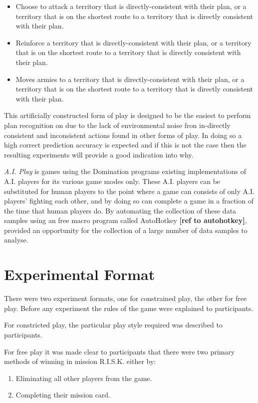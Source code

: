 \documentclass[parskip]{cs4rep}
\begin{document}
\begin{itemize}
\item
Choose to attack a territory that is directly-consistent with their plan, or a territory that is on the shortest route to a territory that is directly consistent with their plan.
\item
Reinforce a territory that is directly-consistent with their plan, or a territory that is on the shortest route to a territory that is directly consistent with their plan.
\item
Moves armies to a territory that is directly-consistent with their plan, or a territory that is on the shortest route to a territory that is directly consistent with their plan.
\end{itemize}

This artificially constructed form of play is designed to be the easiest to perform plan recognition on due to the lack of environmental noise fron in-directly consistent and inconsistent actions found in other forms of play. In doing so a high correct prediction accuracy is expected and if this is not the case then the resulting experiments will provide a good indication into why.

\textit{A.I. Play} is games using the Domination programs existing implementations of A.I. players for its various game modes only. These A.I. players can be substituted for human players to the point where a game can consists of only A.I. players' fighting each other, and by doing so can complete a game in a fraction of the time that human players do. By automating the collection of these data samples using an free macro program called AutoHotkey \textbf{[ref to autohotkey]}, provided an opportunity for the collection of a large number of data samples to analyse. 

\section{Experimental Format}

There were two experiment formats, one for constrained play, the other for free play. Before any experiment the rules of the game were explained to participants. 

For constricted play, the particular play style required was described to participants.

For free play it was made clear to participants that there were two primary methods of winning in mission R.I.S.K. either by:

\begin{enumerate}
\item
Eliminating all other players from the game.
\item
Completing their mission card.
\end{enumerate}
\end{document}
